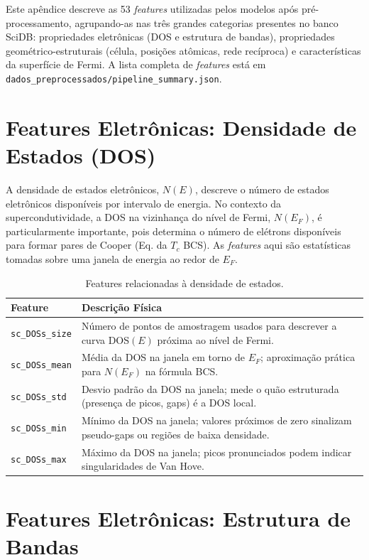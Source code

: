 \documentclass[12pt, a4paper, oneside]{report}
\begin{document}
Este apêndice descreve as 53 \textit{features} utilizadas pelos modelos após pré-processamento, agrupando-as nas três grandes categorias presentes no banco SciDB: propriedades eletrônicas (DOS e estrutura de bandas), propriedades geométrico-estruturais (célula, posições atômicas, rede recíproca) e características da superfície de Fermi. A lista completa de \textit{features} está em \texttt{dados\_preprocessados/pipeline\_summary.json}.

\section{Features Eletrônicas: Densidade de Estados (DOS)}

A densidade de estados eletrônicos, $N(E)$, descreve o número de estados eletrônicos disponíveis por intervalo de energia. No contexto da supercondutividade, a DOS na vizinhança do nível de Fermi, $N(E_F)$, é particularmente importante, pois determina o número de elétrons disponíveis para formar pares de Cooper (Eq. da $T_c$ BCS). As \textit{features} aqui são estatísticas tomadas sobre uma janela de energia ao redor de $E_F$.

\begin{table}[H]
    \centering
    \caption{Features relacionadas à densidade de estados.}
    \begin{tabular}{lp{10cm}}
        \toprule
        \textbf{Feature} & \textbf{Descrição Física} \\
        \midrule
        \texttt{sc\_DOSs\_size} & Número de pontos de amostragem usados para descrever a curva DOS$(E)$ próxima ao nível de Fermi. \\
        \texttt{sc\_DOSs\_mean} & Média da DOS na janela em torno de $E_F$; aproximação prática para $N(E_F)$ na fórmula BCS. \\
        \texttt{sc\_DOSs\_std} & Desvio padrão da DOS na janela; mede o quão estruturada (presença de picos, gaps) é a DOS local. \\
        \texttt{sc\_DOSs\_min} & Mínimo da DOS na janela; valores próximos de zero sinalizam pseudo-gaps ou regiões de baixa densidade. \\
        \texttt{sc\_DOSs\_max} & Máximo da DOS na janela; picos pronunciados podem indicar singularidades de Van Hove. \\
        \bottomrule
    \end{tabular}
\end{table}

\section{Features Eletrônicas: Estrutura de Bandas}
\end{document}
